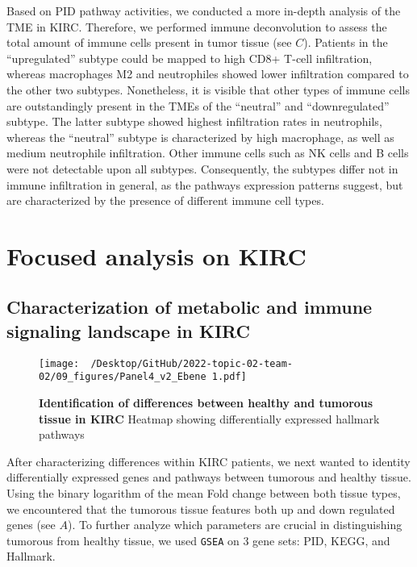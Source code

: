 \documentclass[
  parskip,
  openany]{scrreprt}
\begin{document}
Based on PID pathway activities, we conducted a more in-depth analysis
of the TME in KIRC. Therefore, we performed immune deconvolution to
assess the total amount of immune cells present in tumor tissue (see
 \(C\)). Patients in the ``upregulated'' subtype could be
mapped to high CD8+ T-cell infiltration, whereas macrophages M2 and
neutrophiles showed lower infiltration compared to the other two
subtypes. Nonetheless, it is visible that other types of immune cells
are outstandingly present in the TMEs of the ``neutral'' and
``downregulated'' subtype. The latter subtype showed highest
infiltration rates in neutrophils, whereas the ``neutral'' subtype is
characterized by high macrophage, as well as medium neutrophile
infiltration. Other immune cells such as NK cells and B cells were not
detectable upon all subtypes. Consequently, the subtypes differ not in
immune infiltration in general, as the pathways expression patterns
suggest, but are characterized by the presence of different immune cell
types.

\hypertarget{focused-analysis-on-kirc}{%
\section{Focused analysis on KIRC}\label{focused-analysis-on-kirc}}

\hypertarget{characterization-of-metabolic-and-immune-signaling-landscape-in-kirc}{%
\subsection{Characterization of metabolic and immune signaling landscape
in
KIRC}\label{characterization-of-metabolic-and-immune-signaling-landscape-in-kirc}}

\begin{figure}[h]
 \begin{center}
   \texttt{[image: ~/Desktop/GitHub/2022-topic-02-team-02/09\_figures/Panel4\_v2\_Ebene 1.pdf]}
  \end{center}
  \caption{\textbf{Identification of differences between healthy and tumorous tissue in KIRC } Heatmap showing differentially expressed hallmark pathways}
  \label{volcano}
\end{figure}

After characterizing differences within KIRC patients, we next wanted to
identity differentially expressed genes and pathways between tumorous
and healthy tissue. Using the binary logarithm of the mean Fold change
between both tissue types, we encountered that the tumorous tissue
features both up and down regulated genes (see  \(A\)).
To further analyze which parameters are crucial in distinguishing
tumorous from healthy tissue, we used \texttt{GSEA} on 3 gene sets: PID,
KEGG, and Hallmark.
\end{document}
